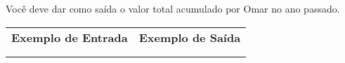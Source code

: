 Você deve dar como saída o valor total acumulado por Omar no ano passado.

\begin{flushleft}
\begin{tabularx}{1.01\textwidth}{ | p{6cm} | p{10cm} | }
\hline
\textbf{Exemplo de Entrada} & \textbf{Exemplo de Saída} \\

&

\\
\hline

&

\\
\hline
\end{tabularx}
\end{flushleft}
